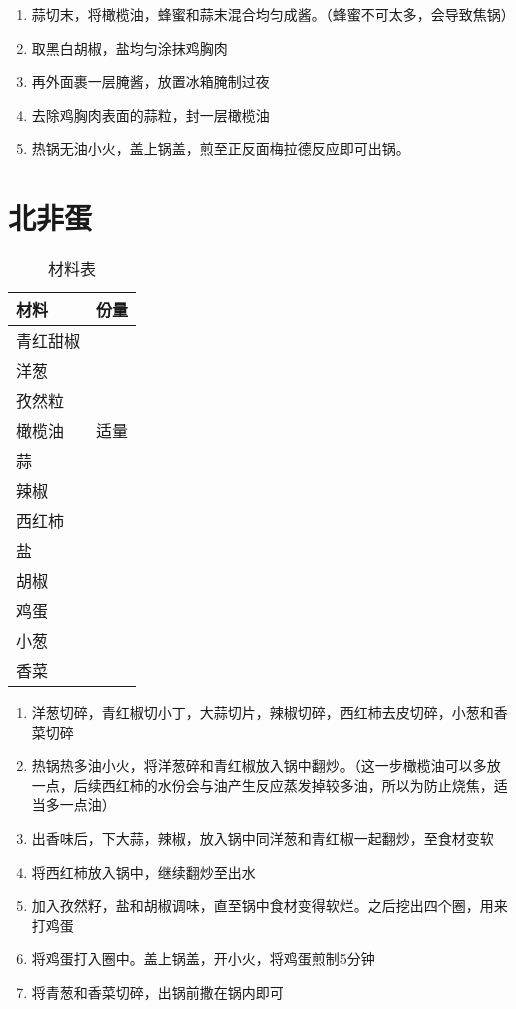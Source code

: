 \begin{enumerate}
    \item 蒜切末，将橄榄油，蜂蜜和蒜末混合均匀成酱。（蜂蜜不可太多，会导致焦锅）
    \item 取黑白胡椒，盐均匀涂抹鸡胸肉
    \item 再外面裹一层腌酱，放置冰箱腌制过夜
    \item 去除鸡胸肉表面的蒜粒，封一层橄榄油
    \item 热锅无油小火，盖上锅盖，煎至正反面梅拉德反应即可出锅。
\end{enumerate}


\section{北非蛋}

\begin{table}[H]
    \centering
    \begin{tabular}{|l||c|}\hline
     \textbf{材料}    &  \textbf{份量}\\ \hline\hline
    青红甜椒 &  \\ \hline
    洋葱 &  \\ \hline
    孜然粒 &  \\ \hline
    橄榄油 & 适量 \\ \hline
    蒜 & \\ \hline
    辣椒 & \\ \hline
    西红柿 & \\ \hline
    盐 & \\ \hline
    胡椒 & \\ \hline
    鸡蛋 & \\ \hline
    小葱 & \\ \hline
    香菜 & \\ \hline
    \end{tabular}
    \caption{材料表}
\end{table}

\begin{enumerate}
    \item 洋葱切碎，青红椒切小丁，大蒜切片，辣椒切碎，西红柿去皮切碎，小葱和香菜切碎
    \item 热锅热多油小火，将洋葱碎和青红椒放入锅中翻炒。（这一步橄榄油可以多放一点，后续西红柿的水份会与油产生反应蒸发掉较多油，所以为防止烧焦，适当多一点油）
    \item 出香味后，下大蒜，辣椒，放入锅中同洋葱和青红椒一起翻炒，至食材变软
    \item 将西红柿放入锅中，继续翻炒至出水
    \item 加入孜然籽，盐和胡椒调味，直至锅中食材变得软烂。之后挖出四个圈，用来打鸡蛋
    \item 将鸡蛋打入圈中。盖上锅盖，开小火，将鸡蛋煎制5分钟
    \item 将青葱和香菜切碎，出锅前撒在锅内即可
\end{enumerate}



